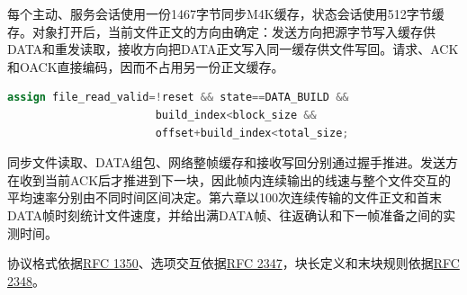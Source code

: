 每个主动、服务会话使用一份1467字节同步M4K缓存，状态会话使用512字节缓存。对象打开后，当前文件正文的方向由确定：发送方向把源字节写入缓存供DATA和重发读取，接收方向把DATA正文写入同一缓存供文件写回。请求、ACK和OACK直接编码，因而不占用另一份正文缓存。

\par\noindent\begin{minipage}{\linewidth}
\begin{lstlisting}[language=Verilog,caption={发送组包以当前会话块长控制读取}]
assign file_read_valid=!reset && state==DATA_BUILD &&
                       build_index<block_size &&
                       offset+build_index<total_size;
\end{lstlisting}
\end{minipage}\par

同步文件读取、DATA组包、网络整帧缓存和接收写回分别通过握手推进。发送方在收到当前ACK后才推进到下一块，因此帧内连续输出的线速与整个文件交互的平均速率分别由不同时间区间决定。第六章以100次连续传输的文件正文和首末DATA帧时刻统计文件速度，并给出满DATA帧、往返确认和下一帧准备之间的实测时间。

协议格式依据\href{https://www.rfc-editor.org/rfc/rfc1350.html}{RFC 1350}、选项交互依据\href{https://www.rfc-editor.org/rfc/rfc2347.html}{RFC 2347}，块长定义和末块规则依据\href{https://www.rfc-editor.org/rfc/rfc2348.html}{RFC 2348}。
